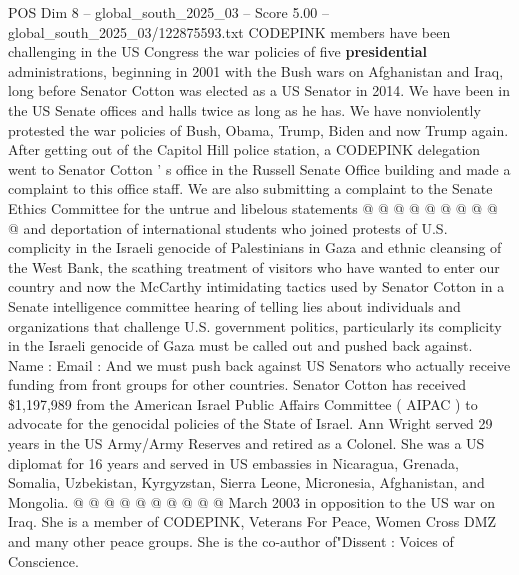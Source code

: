 \begin{textsample}{POS Dim 8 – global\_south\_2025\_03 – Score 5.00 – global\_south\_2025\_03/122875593.txt}
CODEPINK members have been challenging in the US Congress the war policies of five \textbf{presidential} administrations, beginning in 2001 with the Bush wars on Afghanistan and Iraq, long before Senator Cotton was elected as a US Senator in 2014.
We have been in the US Senate offices and halls twice as long as he has.
We have nonviolently protested the war policies of Bush, Obama, Trump, Biden and now Trump again.
After getting out of the Capitol Hill police station, a CODEPINK delegation went to Senator Cotton ' s office in the Russell Senate Office building and made a complaint to this office staff.
We are also submitting a complaint to the Senate Ethics Committee for the untrue and libelous statements @ @ @ @ @ @ @ @ @ @ and deportation of international students who joined protests of U.S. complicity in the Israeli genocide of Palestinians in Gaza and ethnic cleansing of the West Bank, the scathing treatment of visitors who have wanted to enter our country and now the McCarthy intimidating tactics used by Senator Cotton in a Senate intelligence committee hearing of telling lies about individuals and organizations that challenge U.S. government politics, particularly its complicity in the Israeli genocide of Gaza must be called out and pushed back against.
Name : Email : And we must push back against US Senators who actually receive funding from front groups for other countries.
Senator Cotton has received \$1,197,989 from the American Israel Public Affairs Committee ( AIPAC ) to advocate for the genocidal policies of the State of Israel.
Ann Wright served 29 years in the US Army/Army Reserves and retired as a Colonel.
She was a US diplomat for 16 years and served in US embassies in Nicaragua, Grenada, Somalia, Uzbekistan, Kyrgyzstan, Sierra Leone, Micronesia, Afghanistan, and Mongolia. @ @ @ @ @ @ @ @ @ @ March 2003 in opposition to the US war on Iraq.
She is a member of CODEPINK, Veterans For Peace, Women Cross DMZ and many other peace groups.
She is the co-author of"Dissent : Voices of Conscience.

\end{textsample}
